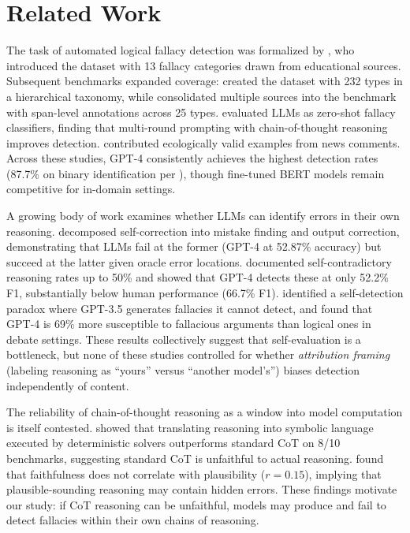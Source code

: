 \section{Related Work}
\label{sec:related}

The task of automated logical fallacy detection was formalized by \citet{jin2022logical}, who introduced the \logicdataset dataset with 13 fallacy categories drawn from educational sources. Subsequent benchmarks expanded coverage: \citet{hong2024closer} created the \fallacies dataset with 232 types in a hierarchical taxonomy, while \citet{helwe2024mafalda} consolidated multiple sources into the \mafalda benchmark with span-level annotations across 25 types. \citet{pan2024llms} evaluated LLMs as zero-shot fallacy classifiers, finding that multi-round prompting with chain-of-thought reasoning improves detection. \citet{yeh2024cocolofa} contributed ecologically valid examples from news comments. Across these studies, GPT-4 consistently achieves the highest detection rates (87.7\% on binary identification per \citet{hong2024closer}), though fine-tuned BERT models remain competitive for in-domain settings.

A growing body of work examines whether LLMs can identify errors in their own reasoning. \citet{tyen2024llms} decomposed self-correction into mistake finding and output correction, demonstrating that LLMs fail at the former (GPT-4 at 52.87\% accuracy) but succeed at the latter given oracle error locations. \citet{liu2024self} documented self-contradictory reasoning rates up to 50\% and showed that GPT-4 detects these at only 52.2\% F1, substantially below human performance (66.7\% F1). \citet{payandeh2023susceptible} identified a self-detection paradox where GPT-3.5 generates fallacies it cannot detect, and found that GPT-4 is 69\% more susceptible to fallacious arguments than logical ones in debate settings. These results collectively suggest that self-evaluation is a bottleneck, but none of these studies controlled for whether \emph{attribution framing} (labeling reasoning as ``yours'' versus ``another model's'') biases detection independently of content.

The reliability of chain-of-thought reasoning as a window into model computation is itself contested. \citet{lyu2023faithful} showed that translating reasoning into symbolic language executed by deterministic solvers outperforms standard CoT on 8/10 benchmarks, suggesting standard CoT is unfaithful to actual reasoning. \citet{arcuschin2025measuring} found that faithfulness does not correlate with plausibility ($r = 0.15$), implying that plausible-sounding reasoning may contain hidden errors. These findings motivate our study: if CoT reasoning can be unfaithful, models may produce and fail to detect fallacies within their own chains of reasoning.

